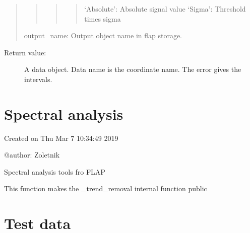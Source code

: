 \documentclass[letterpaper,10pt,english]{sphinxmanual}
\begin{document}
\begin{fulllineitems}
\begin{quote}
\begin{quote}
\begin{quote}
\begin{quote}
‘Absolute’: Absolute signal value
‘Sigma’: Threshold times sigma
\end{quote}
\end{quote}
\end{quote}

output\_name: Output object name in flap storage.
\end{quote}
\begin{description}
\item[{Return value:}] \leavevmode
A data object. Data name is the coordinate name. The error gives the intervals.

\end{description}

\end{fulllineitems}



\section{Spectral analysis}
\label{\detokenize{spectral_analysis:module-flap.spectral_analysis}}\label{\detokenize{spectral_analysis:spectral-analysis}}\label{\detokenize{spectral_analysis::doc}}
Created on Thu Mar  7 10:34:49 2019

@author: Zoletnik

Spectral analysis tools fro FLAP

\begin{fulllineitems}
\label{\detokenize{spectral_analysis:flap.spectral_analysis.trend_removal_func}}
This function makes the \_trend\_removal internal function public

\end{fulllineitems}



\section{Test data}
\label{\detokenize{test_data:test-data}}\label{\detokenize{test_data::doc}}
\end{document}

